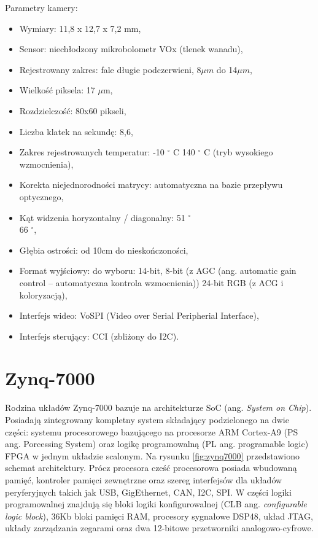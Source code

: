 Parametry kamery:
\begin{itemize}
\item Wymiary: 11,8 x 12,7 x 7,2 mm, 
\item Sensor: niechłodzony mikrobolometr VOx (tlenek wanadu),
\item Rejestrowany zakres: fale długie podczerwieni, 8$\mu m$ do 14$\mu m$,
\item Wielkość piksela: 17 $\mu$m,
\item Rozdzielczość: 80x60 pikseli,
\item Liczba klatek na sekundę: 8,6,  %
\item Zakres rejestrowanych temperatur: -10  $^\circ$  C 140  $^\circ$  C (tryb wysokiego wzmocnienia),
\item Korekta niejednorodności matrycy: automatyczna na bazie przepływu optycznego, %
\item Kąt widzenia horyzontalny / diagonalny: 51 $^\circ$ \\ 66 $^\circ$,
\item Głębia ostrości: od 10cm do nieskończoności,
\item Format wyjściowy: do wyboru: 14-bit, 8-bit (z AGC (ang. automatic gain control -- automatyczna kontrola wzmocnienia)) 24-bit RGB (z ACG i koloryzacją),
\item Interfejs wideo: VoSPI (Video over Serial Peripherial Interface),
\item Interfejs sterujący: CCI (zbliżony do I2C).
\end{itemize}


\section{Zynq-7000}

Rodzina układów Zynq-7000 bazuje na architekturze SoC (ang. \textit{System on Chip}). 
Posiadają zintegrowany kompletny system składający podzielonego na dwie części: systemu procesorowego bazującego na procesorze ARM Cortex-A9 (PS ang. Porcessing System) oraz logikę programowalną (PL ang. programable logic) FPGA w jednym układzie scalonym. %
Na rysunku \ref{fig:zynq7000} przedstawiono schemat architektury. %
Prócz procesora cześć procesorowa posiada wbudowaną pamięć, kontroler pamięci zewnętrzne oraz szereg interfejsów dla układów peryferyjnych takich jak USB, GigEthernet, CAN, I2C, SPI. %
W części logiki programowalnej znajdują się bloki logiki konfigurowalnej (CLB ang. \textit{configurable logic block}), 36Kb bloki pamięci RAM, procesory sygnałowe DSP48, układ JTAG, układy zarządzania zegarami oraz dwa 12-bitowe przetworniki analogowo-cyfrowe.

